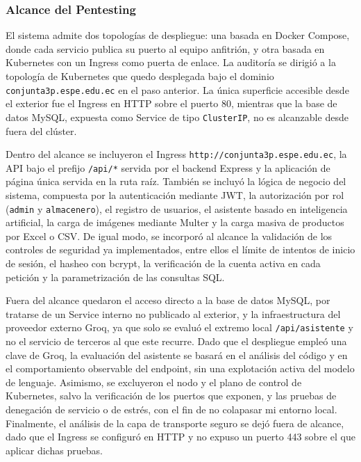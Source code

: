 \documentclass[stu,11pt,spanish,floatsintext]{apa7}
\begin{document}
\subsubsection{Alcance del Pentesting}

El sistema admite dos topologías de despliegue: una basada en Docker Compose, donde cada servicio publica su puerto al equipo anfitrión, y otra basada en Kubernetes con un Ingress como puerta de enlace. La auditoría se dirigió a la topología de Kubernetes que quedo desplegada bajo el dominio \texttt{conjunta3p.espe.edu.ec} en el paso anterior. La única superficie accesible desde el exterior fue el Ingress en HTTP sobre el puerto 80, mientras que la base de datos MySQL, expuesta como Service de tipo \texttt{ClusterIP}, no es alcanzable desde fuera del clúster.

Dentro del alcance se incluyeron el Ingress \texttt{http://conjunta3p.espe.edu.ec}, la API bajo el prefijo \texttt{/api/*} servida por el backend Express y la aplicación de página única servida en la ruta raíz. También se incluyó la lógica de negocio del sistema, compuesta por la autenticación mediante JWT, la autorización por rol (\texttt{admin} y \texttt{almacenero}), el registro de usuarios, el asistente basado en inteligencia artificial, la carga de imágenes mediante Multer y la carga masiva de productos por Excel o CSV. De igual modo, se incorporó al alcance la validación de los controles de seguridad ya implementados, entre ellos el límite de intentos de inicio de sesión, el hasheo con bcrypt, la verificación de la cuenta activa en cada petición y la parametrización de las consultas SQL.

Fuera del alcance quedaron el acceso directo a la base de datos MySQL, por tratarse de un Service interno no publicado al exterior, y la infraestructura del proveedor externo Groq, ya que solo se evaluó el extremo local \texttt{/api/asistente} y no el servicio de terceros al que este recurre. Dado que el despliegue empleó una clave de Groq, la evaluación del asistente se basará en el análisis del código y en el comportamiento observable del endpoint, sin una explotación activa del modelo de lenguaje. Asimismo, se excluyeron el nodo y el plano de control de Kubernetes, salvo la verificación de los puertos que exponen, y las pruebas de denegación de servicio o de estrés, con el fin de no colapasar mi entorno local. Finalmente, el análisis de la capa de transporte seguro se dejó fuera de alcance, dado que el Ingress se configuró en HTTP y no expuso un puerto 443 sobre el que aplicar dichas pruebas.
\end{document}

